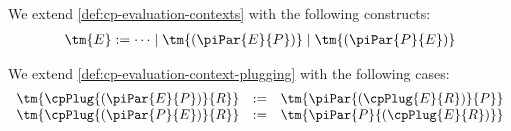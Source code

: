 \begin{definition}\label{def:hcp-evaluation-contexts}
  We extend \cref{def:cp-evaluation-contexts} with the following constructs:
  \begin{align*}
    \tm{E} := \dots \mid \tm{( \piPar{E}{P} )} \mid \tm{( \piPar{P}{E} )}
  \end{align*}
\end{definition}
\begin{definition}[Plugging]\label{def:hcp-evaluation-context-plugging}
  We extend \cref{def:cp-evaluation-context-plugging} with the following cases:
  \begin{gather*}
    \begin{array}{lcl}
      \tm{\cpPlug{( \piPar{E}{P} )}{R}}
      & := & \tm{\piPar{( \cpPlug{E}{R} )}{P}}
      \\
      \tm{\cpPlug{( \piPar{P}{E} )}{R}}
      & := & \tm{\piPar{P}{( \cpPlug{E}{R} )}}
    \end{array}
  \end{gather*}
\end{definition}

